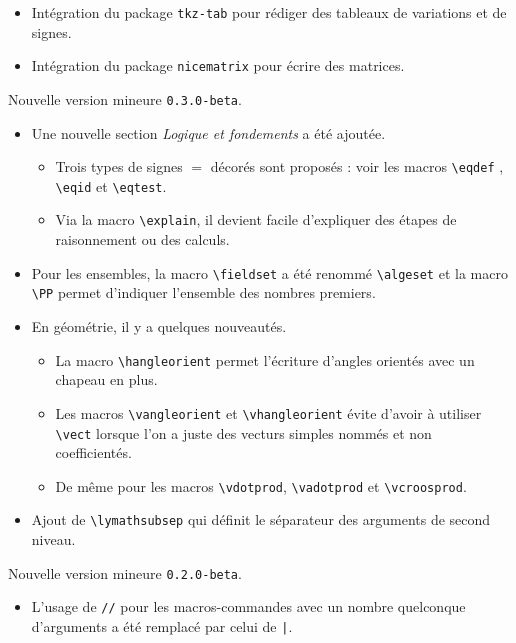 \documentclass[12pt,a4paper]{article}
\theoremstyle{definition}
\begin{document}
\begin{description}[leftmargin=1em]
\begin{itemize}
		\item Intégration du package \verb+tkz-tab+ pour rédiger des tableaux de variations et de signes.

		\item Intégration du package \verb+nicematrix+ pour écrire des matrices.
	\end{itemize}


	\item[2019-07-23] Nouvelle version mineure \verb+0.3.0-beta+.
	\begin{itemize}
		\item Une nouvelle section \emph{\og Logique et fondements \fg} a été ajoutée.
		\begin{itemize}
			\item Trois types de signes $=$ décorés sont proposés : voir les macros \verb+\eqdef+ , \verb+\eqid+ et \verb+\eqtest+.

			\item Via la macro \verb+\explain+, il devient facile d'expliquer des étapes de raisonnement ou des calculs.
		\end{itemize}

		\item Pour les ensembles, la macro \verb+\fieldset+ a été renommé \verb+\algeset+ et la macro \verb+\PP+ permet d'indiquer l'ensemble des nombres premiers.

		\item En géométrie, il y a quelques nouveautés.
		\begin{itemize}
			\item La macro \verb+\hangleorient+ permet l'écriture d'angles orientés avec un chapeau en plus.

			\item Les macros \verb+\vangleorient+ et \verb+\vhangleorient+ évite d'avoir à utiliser \verb+\vect+ lorsque l'on a juste des vecturs simples nommés et non coefficientés.

			\item De même pour les macros \verb+\vdotprod+, \verb+\vadotprod+ et \verb+\vcroosprod+.
		\end{itemize}

		\item Ajout de \verb+\lymathsubsep+ qui définit le séparateur des arguments de second niveau.
	\end{itemize}


	\item[2019-02-21] Nouvelle version mineure \verb+0.2.0-beta+.
	\begin{itemize}
		\item L'usage de \verb+//+ pour les macros-commandes avec un nombre quelconque d'arguments a été remplacé par celui de \verb+|+.


\end{itemize}
\end{description}
\end{document}
